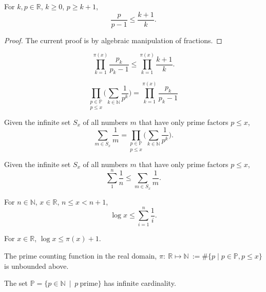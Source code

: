 \begin{lemma}
\label{lem:lemma4-1}
\leanok
For $k,p \in\mathbb{R}$, $k\ge0$, $p \ge k+1$,
$$\frac{p}{p-1} \le \frac{k+1}{k}.$$
\end{lemma}
\begin{proof}
\leanok
The current proof is by algebraic manipulation of fractions.
\end{proof}

\begin{lemma}
\label{lem:lemma4}
\leanok
$$\prod_{k=1}^{\pi(x)}\frac{p_k}{p_k-1} \le \prod_{k=1}^{\pi(x)}\frac{k+1}{k}.$$
\end{lemma}

\begin{lemma}
\label{lem:lemma3}
    $$\underset{p\le x}{\prod_{p\in\mathbb{P}}}\Big(\sum_{k\in\mathbb{N}}\frac{1}{p^k}\Big) = \prod_{k=1}^{\pi(x)}\frac{p_k}{p_k-1}$$
\end{lemma}

\begin{lemma}
\label{lem:lemma2}
Given the infinite set $S_x$ of all numbers $m$ that have only prime factors $p\le x$,
    $$\sum_{m\in S_x}\frac{1}{m} = \underset{p\le x}{\prod_{p\in\mathbb{P}}}\Big(\sum_{k\in\mathbb{N}}\frac{1}{p^k}\Big).$$
\end{lemma}

\begin{lemma}
\label{lem:lemma1}
Given the infinite set $S_x$ of all numbers $m$ that have only prime factors $p\le x$,
$$\sum_1^n\frac1n \le \sum_{m\in S_x}\frac{1}{m}. $$
\end{lemma}

\begin{lemma}
\label{lem:lemma0}
For $n\in\mathbb{N}$, $x\in\mathbb{R}$, $n\le x < n+1$,
$$\log x \le \sum_{i=1}^n\frac1i.$$
\end{lemma}

\begin{theorem}
\label{thm:log_le_primeCountingReal_add_one}
For $x\in\mathbb{R}$, $\log x \le \pi(x) +1$.
\end{theorem}

\begin{theorem}
\label{thm:primeCountingReal_unbounded}
The prime counting function in the real domain, $\pi:\ \mathbb{R} \mapsto \mathbb{N} \ := \#\big\{p\mid p \in\mathbb{P}, p\le x \big\}$ is unbounded above.
\end{theorem}

\begin{theorem}
\label{thm:infinite_primes}
The set $\mathbb{P} = \big\{p \in \mathbb{N} \ \mid \ p \ \mathrm{prime} \big\}$ has infinite cardinality. 
\end{theorem}

